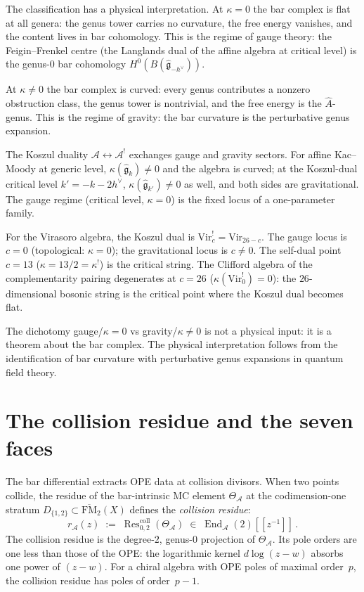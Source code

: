 \documentclass[11pt,reqno]{amsart}
\theoremstyle{definition}
\theoremstyle{remark}
\newcommand{\cA}{\mathcal{A}}
\newcommand{\FM}{\overline{\mathrm{FM}}}
\newcommand{\fg}{\mathfrak{g}}
\newcommand{\Res}{\operatorname{Res}}
\newcommand{\Vir}{\mathrm{Vir}}
\DeclareMathOperator{\End}{End}
\numberwithin{equation}{section}
\begin{document}
The classification has a physical interpretation. At
$\kappa = 0$ the bar complex is flat at all genera:
the genus tower carries no curvature, the free energy
vanishes, and the content lives in bar cohomology. This
is the regime of gauge theory: the Feigin--Frenkel centre
(the Langlands dual of the affine algebra at critical level)
is the genus-$0$ bar cohomology $H^0(B(\widehat{\fg}_{-h^\vee}))$.

At $\kappa \ne 0$ the bar complex is curved: every genus
contributes a nonzero obstruction class, the genus tower
is nontrivial, and the free energy is the $\hat{A}$-genus.
This is the regime of gravity: the bar curvature is the
perturbative genus expansion.

The Koszul duality $\cA \leftrightarrow \cA^!$ exchanges
gauge and gravity sectors. For affine Kac--Moody at
generic level, $\kappa(\widehat{\fg}_k) \ne 0$ and the
algebra is curved; at the Koszul-dual critical level
$k' = -k - 2h^\vee$, $\kappa(\widehat{\fg}_{k'}) \ne 0$
as well, and both sides are gravitational. The gauge regime
(critical level, $\kappa = 0$) is the fixed locus of a
one-parameter family.

For the Virasoro algebra, the Koszul dual is
$\Vir_c^! = \Vir_{26-c}$. The gauge locus is $c = 0$
(topological: $\kappa = 0$); the gravitational locus is
$c \ne 0$. The self-dual point $c = 13$
($\kappa = 13/2 = \kappa^!$) is the critical string.
The Clifford algebra of the complementarity pairing
degenerates at $c = 26$ ($\kappa(\Vir_0^!) = 0$):
the $26$-dimensional bosonic string is the critical point
where the Koszul dual becomes flat.

The dichotomy gauge/$\kappa{=}0$ vs
gravity/$\kappa{\ne}0$ is not a physical input: it is a
theorem about the bar complex. The physical interpretation
follows from the identification of bar curvature with
perturbative genus expansions in quantum field theory.


\section{The collision residue and the seven faces}
\label{sec:seven-faces}

The bar differential extracts OPE data at collision divisors.
When two points collide, the residue of the bar-intrinsic MC
element $\Theta_\cA$ at the codimension-one stratum
$D_{\{1,2\}} \subset \FM_2(X)$ defines the \emph{collision
residue}:
\begin{equation}\label{eq:collision-residue}
r_\cA(z)
\;:=\;
\Res^{\mathrm{coll}}_{0,2}(\Theta_\cA)
\;\in\;
\End_\cA(2)[\![z^{-1}]\!]\,.
\end{equation}
The collision residue is the degree-$2$, genus-$0$ projection
of $\Theta_\cA$. Its pole orders are one less than those of
the OPE: the logarithmic kernel $d\log(z-w)$ absorbs one
power of $(z - w)$. For a chiral algebra with OPE poles of
maximal order~$p$, the collision residue has poles of
order~$p - 1$.
\end{document}
